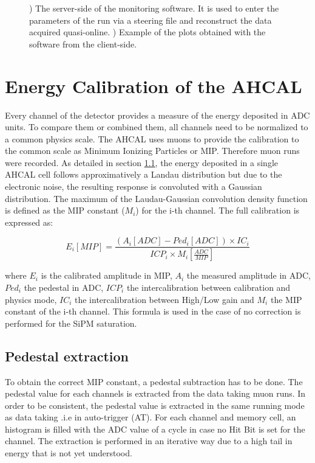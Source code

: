 \begin{figure}[htbp!]
\begin{subfigure}[t]{0.5\textwidth}
		\caption{} \label{fig:QtReco_Client}
	\end{subfigure}
	\caption{) The server-side of the monitoring software. It is used to enter the parameters of the run via a steering file and reconstruct the data acquired quasi-online. ) Example of the plots obtained with the software from the client-side.}
\end{figure}

\section{Energy Calibration of the AHCAL}

Every channel of the detector provides a measure of the energy deposited in ADC units. To compare them or combined them, all channels need to be normalized to a common physics scale. The AHCAL uses muons to provide the calibration to the common scale as Minimum Ionizing Particles or MIP. Therefore muon runs were recorded. As detailed in section \ref{}, the energy deposited in a single AHCAL cell follows approximatively a Landau distribution but due to the electronic noise, the resulting response is convoluted with a Gaussian distribution. The maximum of the Laudau-Gaussian convolution density function is defined as the MIP constant ($M_{i}$) for the i-th channel. The full calibration is expressed as:

\begin{equation}
	E_i [MIP] = \frac{(A_i [ADC] - Ped_i [ADC]) \times IC_i }{ICP_i \times M_{i} [\frac{ADC}{MIP}]}
\end{equation}

where $E_i$ is the calibrated amplitude in MIP, $A_i$ the measured amplitude in ADC, $Ped_i$ the pedestal in ADC, $ICP_i$ the intercalibration between calibration and physics mode, $IC_i$ the intercalibration between High/Low gain and $M_{i}$ the MIP constant of the i-th channel. This formula is used in the case of no correction is performed for the SiPM saturation.

\subsection{Pedestal extraction}

To obtain the correct MIP constant, a pedestal subtraction has to be done. The pedestal value for each channels is extracted from the data taking muon runs. In order to be consistent, the pedestal value is extracted in the same running mode as data taking .i.e in auto-trigger (AT). For each channel and memory cell, an histogram is filled with the ADC value of a cycle in case no Hit Bit is set for the channel. The extraction is performed in an iterative way due to a high tail in energy that is not yet understood.

